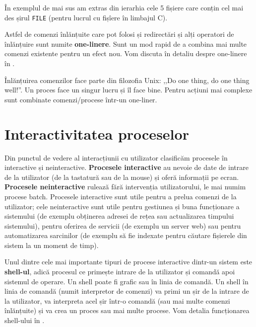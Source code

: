 În exemplul de mai sus am extras din ierarhia  cele 5 fișiere care conțin cel mai des șirul \texttt{FILE} (pentru lucrul cu fișîere în limbajul C).

Astfel de comenzi înlănțuite care pot folosi și redirectări și alți operatori de
înlănțuire sunt numite \textbf{one-linere}. Sunt un mod rapid de a combina mai
multe comenzi existente pentru un efect nou. Vom discuta în detaliu despre one-linere în .

\begin{note}
Înlănțuirea comenzilor face parte din filozofia Unix: ,,Do one thing, do
one thing well!''. Un proces face un singur lucru și îl face bine. Pentru acțiuni
mai complexe sunt combinate comenzi/procese într-un one-liner.
\end{note}

\section{Interactivitatea proceselor}
\label{sec:procese-interactivitate}

Din punctul de vedere al interacțiunii cu utilizator clasificăm procesele în
interactive și neinteractive. \textbf{Procesele interactive} au nevoie de date de intrare
de la utilizator (de la tastatură sau de la mouse) și oferă informații pe ecran.
\textbf{Procesele neinteractive} rulează fără intervenția utilizatorului, le mai numim procese
batch. Procesele interactive sunt utile pentru a prelua comenzi de la
utilizator; cele neinteractive sunt utile pentru gestiunea și buna funcționare a
sistemului (de exemplu obținerea adresei de rețea sau actualizarea timpului
sistemului), pentru oferirea de servicii (de exemplu un server web) sau pentru
automatizarea sarcinilor (de exemplu să fie indexate pentru căutare fișierele
din sistem la un moment de timp).

Unul dintre cele mai importante tipuri de procese interactive dintr-un sistem
este \textbf{shell-ul}, adică procesul ce primește intrare de la utilizator și comandă
apoi sistemul de operare. Un shell poate fi grafic sau în linia de comandă. Un
shell în linia de comandă (numit interpretor de comenzi) va primi un șir de la
intrare de la utilizator, va interpreta acel șir într-o comandă (sau mai multe
comenzi înlănțuite) și va crea un proces sau mai multe procese. Vom detalia
funcționarea shell-ului în .


